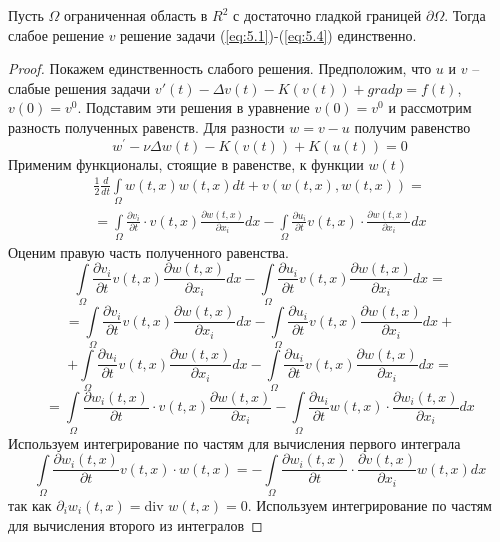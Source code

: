 \begin{theorem}
    Пусть $\Omega$ ограниченная область в $R^2$ с достаточно гладкой границей $\partial\Omega$. Тогда слабое решение $v$  решение
    задачи (\ref{eq:5.1})-(\ref{eq:5.4}) единственно.
\end{theorem}
\begin{proof}
    Покажем единственность слабого решения. Предположим, что $u$ и $v$ -- слабые решения задачи $v\prime(t)-\Delta v(t)- K(v(t))+grad p= f(t)$, $v(0)=v^0$.
    Подставим эти решения в уравнение $v(0)=v^0$ и рассмотрим разность полученных равенств. Для разности $w = v - u$ получим равенство
    $$w^\prime - \nu\Delta w(t) - K(v(t)) + K(u(t)) = 0$$
    Применим функционалы, стоящие в равенстве, к функции $w(t)$
    \begin{equation}\label{eq:5.36}
        \begin{gathered}
            \frac{1}{2}\frac{d}{dt}\int\limits_\Omega w(t, x)w(t, x)dt+v(w(t, x),w(t, x))= \\
            =\int\limits_\Omega\frac{\partial v_i}{\partial t}\cdot v(t, x)\frac{\partial w(t, x)}{\partial x_i}dx-\int\limits_\Omega\frac{\partial u_i}{\partial t}v(t, x)\cdot\frac{\partial w(t, x)}{\partial x_i}dx
        \end{gathered}
    \end{equation}
    Оценим правую часть полученного равенства.
    $$\int\limits_\Omega\frac{\partial v_i}{\partial t}v(t, x)\frac{\partial w(t, x)}
    {\partial x_i}dx-\int\limits_\Omega\frac{\partial u_i}{\partial t}v(t, x)\frac{\partial w(t, x)}{\partial x_i}dx=$$
    $$=\int\limits_\Omega\frac{\partial v_i}{\partial t}v(t, x)\frac{\partial w(t, x)}
    {\partial x_i}dx-\int\limits_\Omega\frac{\partial u_i}{\partial t}v(t, x)\frac{\partial w(t, x)}{\partial x_i}dx+$$
    $$+\int\limits_\Omega\frac{\partial u_i}{\partial t}v(t, x)\frac{\partial w(t, x)}
    {\partial x_i}dx-\int\limits_\Omega\frac{\partial u_i}{\partial t}v(t, x)\frac{\partial w(t, x)}{\partial x_i}dx=$$
    $$=\int\limits_\Omega\frac{\partial w_i(t, x)}{\partial t}\cdot v(t, x)\frac{\partial w(t, x)}
    {\partial x_i}-\int\limits_\Omega\frac{\partial u_i}{\partial t}w(t, x)\cdot\frac{\partial w_i(t, x)}{\partial x_i}dx$$
    Используем интегрирование по частям для вычисления первого интеграла
    $$\int\limits_\Omega\frac{\partial w_i(t, x)}{\partial t}v(t, x)\cdot w(t, x)=
    -\int\limits_\Omega\frac{\partial w_i(t, x)}{\partial t}\cdot\frac{\partial v(t, x)}{\partial x_i}w(t, x)dx$$
    так как $\partial_iw_i(t, x) = \textrm{div } w(t, x)=0$. Используем интегрирование по частям для вычисления второго из интегралов

\end{proof}

